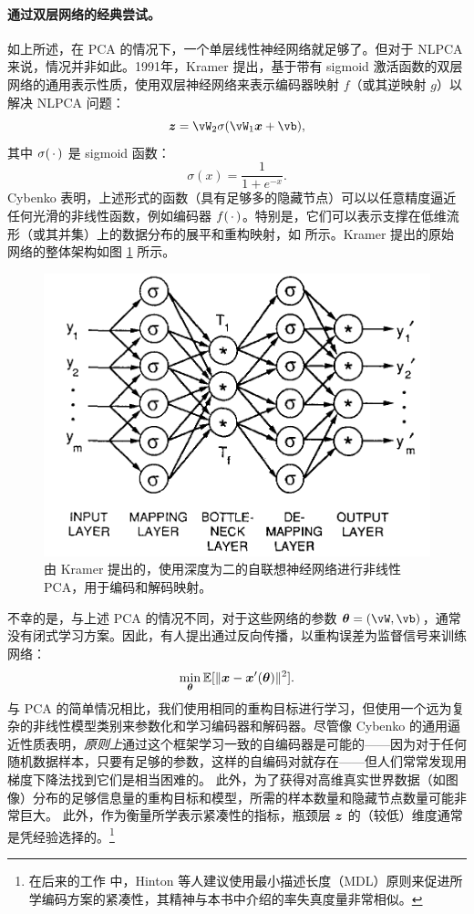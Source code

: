 \documentclass[../../book-main.tex]{subfiles}
\begin{document}
\paragraph{通过双层网络的经典尝试。} 如上所述，在 PCA 的情况下，一个单层线性神经网络就足够了。但对于 NLPCA 来说，情况并非如此。1991年，Kramer \cite{Kramer1991NonlinearPC} 提出，基于带有 sigmoid 激活函数的双层网络的通用表示性质，使用双层神经网络来表示编码器映射 $f$（或其逆映射 $g$）以解决 NLPCA 问题：
\begin{equation}
  \z = \vW_2 \sigma(\vW_1\x +\vb),
\end{equation}
其中 $\sigma(\,\cdot\,)$ 是 sigmoid 函数：
\begin{equation}
  \sigma(x) = \frac{1}{1+ e^{-x}}.
\end{equation}
Cybenko \cite{Cybenko1989ApproximationBS} 表明，上述形式的函数（具有足够多的隐藏节点）可以以任意精度逼近任何光滑的非线性函数，例如编码器 $f(\,\cdot\,)$。特别是，它们可以表示支撑在低维流形（或其并集）上的数据分布的展平和重构映射，如  所示。Kramer 提出的原始网络的整体架构如图 \ref{fig:NLPCA} 所示。
\begin{figure}[tb]
  \centering
  \includegraphics[width=0.6\linewidth]{figures/kramer1991nonlinearPCA.png}
  \caption{由 Kramer \cite{Kramer1991NonlinearPC} 提出的，使用深度为二的自联想神经网络进行非线性 PCA，用于编码和解码映射。}
  \label{fig:NLPCA}
\end{figure}

不幸的是，与上述 PCA 的情况不同，对于这些网络的参数 $\boldsymbol{\theta} = (\vW, \vb)$，通常没有闭式学习方案。因此，有人提出通过反向传播，以重构误差为监督信号来训练网络：
\begin{equation}\label{eq:nonlinear-pca-ch5}
  \min_{\boldsymbol{\theta}} \mathbb{E}[ \|\bm{x} - \bm{x}'(\boldsymbol{\theta})\|^2].
\end{equation}
与 PCA 的简单情况相比，我们使用相同的重构目标进行学习，但使用一个远为复杂的非线性模型类别来参数化和学习编码器和解码器。尽管像 Cybenko 的通用逼近性质表明，\textit{原则上}通过这个框架学习一致的自编码器是可能的——因为对于任何随机数据样本，只要有足够的参数，这样的自编码对就存在——但人们常常发现用梯度下降法找到它们是相当困难的。
此外，为了获得对高维真实世界数据（如图像）分布的足够信息量的重构目标和模型，所需的样本数量和隐藏节点数量可能非常巨大。
此外，作为衡量所学表示紧凑性的指标，瓶颈层 $\bm{z}$ 的（较低）维度通常是凭经验选择的。\footnote{在后来的工作 \cite{Hinton-1993} 中，Hinton 等人建议使用最小描述长度（MDL）原则来促进所学编码方案的紧凑性，其精神与本书中介绍的率失真度量非常相似。}
\end{document}
